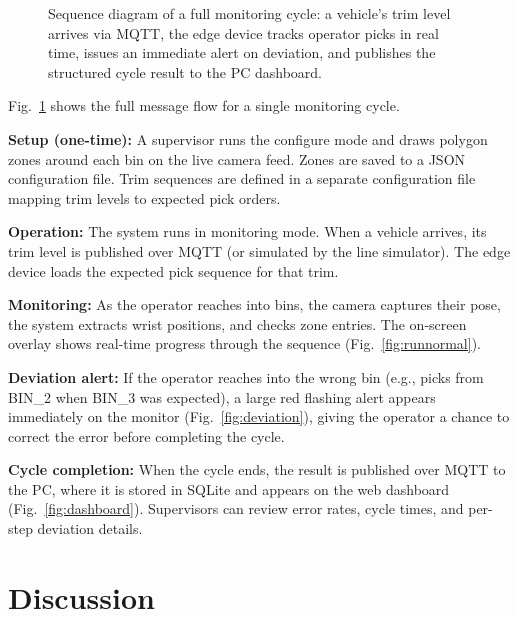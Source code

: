 \documentclass[conference]{IEEEtran}
\begin{document}
\begin{figure}[htbp]
\caption{Sequence diagram of a full monitoring cycle: a vehicle's trim level arrives via MQTT, the edge device tracks operator picks in real time, issues an immediate alert on deviation, and publishes the structured cycle result to the PC dashboard.}
\label{fig:sequence}
\end{figure}

Fig.~\ref{fig:sequence} shows the full message flow for a single monitoring cycle.

\textbf{Setup (one-time):} A supervisor runs the configure mode and draws polygon zones around each bin on the live camera feed. Zones are saved to a JSON configuration file. Trim sequences are defined in a separate configuration file mapping trim levels to expected pick orders.

\textbf{Operation:} The system runs in monitoring mode. When a vehicle arrives, its trim level is published over MQTT (or simulated by the line simulator). The edge device loads the expected pick sequence for that trim.

\textbf{Monitoring:} As the operator reaches into bins, the camera captures their pose, the system extracts wrist positions, and checks zone entries. The on-screen overlay shows real-time progress through the sequence (Fig.~\ref{fig:runnormal}).

\textbf{Deviation alert:} If the operator reaches into the wrong bin (e.g., picks from BIN\_2 when BIN\_3 was expected), a large red flashing alert appears immediately on the monitor (Fig.~\ref{fig:deviation}), giving the operator a chance to correct the error before completing the cycle.

\textbf{Cycle completion:} When the cycle ends, the result is published over MQTT to the PC, where it is stored in SQLite and appears on the web dashboard (Fig.~\ref{fig:dashboard}). Supervisors can review error rates, cycle times, and per-step deviation details.

\section{Discussion}
\end{document}
